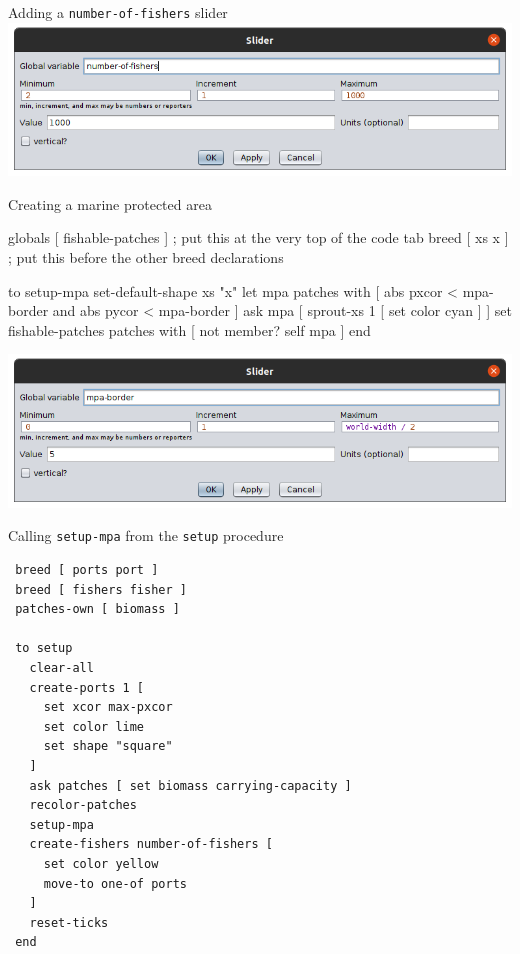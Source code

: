 \documentclass[table, 14pt, aspectratio=169]{beamer}
\begin{document}
\begin{frame}{Adding a \texttt{number-of-fishers} slider}
  \centering\vfill
  \includegraphics[width=\linewidth]{images/numer_of_fishers_slider.png}
  \vfill
\end{frame}

\begin{frame}[fragile=singleslide]{Creating a marine protected area}
  \begin{adjustbox}{max width=\linewidth}
    \begin{nlogo}
globals [ fishable-patches ] ; put this at the very top of the code tab
breed [ xs x ] ; put this before the other breed declarations

to setup-mpa
  set-default-shape xs "x"
  let mpa patches with [ abs pxcor < mpa-border and abs pycor < mpa-border ]
  ask mpa [ sprout-xs 1 [ set color cyan ] ]
  set fishable-patches patches with [ not member? self mpa ]
end
    \end{nlogo}
  \end{adjustbox}
  \vfill
  \includegraphics[height=0.35\textheight]{images/map_border_slider.png}
\end{frame}

\begin{frame}[fragile=singleslide]{Calling \texttt{setup-mpa} from the \texttt{setup} procedure}\scriptsize
  \begin{verbatim}
 breed [ ports port ]
 breed [ fishers fisher ]
 patches-own [ biomass ]
 
 to setup
   clear-all
   create-ports 1 [
     set xcor max-pxcor
     set color lime
     set shape "square"
   ]
   ask patches [ set biomass carrying-capacity ]
   recolor-patches
   setup-mpa
   create-fishers number-of-fishers [
     set color yellow
     move-to one-of ports
   ]
   reset-ticks
 end
  \end{verbatim}  
\end{frame}
\end{document}
